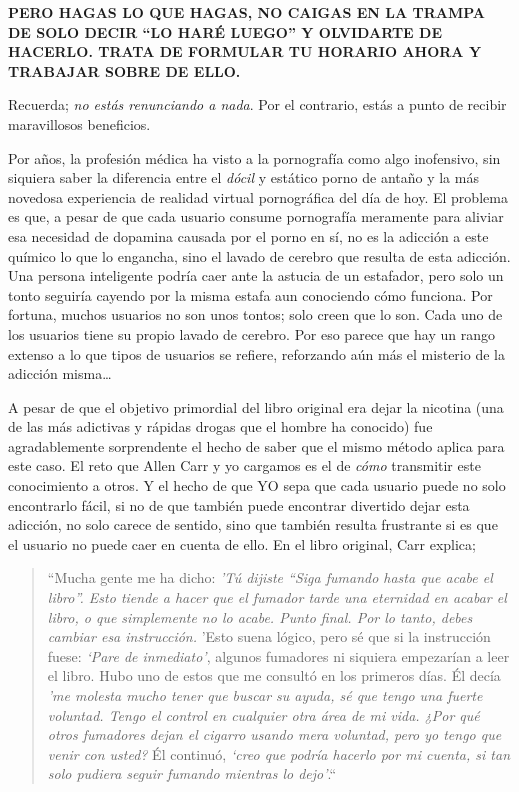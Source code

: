 \documentclass[
]{book}
\begin{document}
\textbf{PERO HAGAS LO QUE HAGAS, NO CAIGAS EN LA TRAMPA DE SOLO DECIR ``LO HARÉ LUEGO'' Y OLVIDARTE DE HACERLO. TRATA DE FORMULAR TU HORARIO {AHORA} Y TRABAJAR SOBRE DE ELLO.}

Recuerda; \emph{no estás renunciando a nada}. Por el contrario, estás a punto de recibir maravillosos beneficios.

Por años, la profesión médica ha visto a la pornografía como algo inofensivo, sin siquiera saber la diferencia entre el \emph{dócil} y estático porno de antaño y la más novedosa experiencia de realidad virtual pornográfica del día de hoy. El problema es que, a pesar de que cada usuario consume pornografía meramente para aliviar esa necesidad de dopamina causada por el porno en sí, no es la adicción a este químico lo que lo engancha, sino el lavado de cerebro que resulta de esta adicción. Una persona inteligente podría caer ante la astucia de un estafador, pero solo un tonto seguiría cayendo por la misma estafa aun conociendo cómo funciona. Por fortuna, muchos usuarios no son unos tontos; solo creen que lo son. Cada uno de los usuarios tiene su propio lavado de cerebro. Por eso parece que hay un rango extenso a lo que tipos de usuarios se refiere, reforzando aún más el misterio de la adicción misma\ldots{}

A pesar de que el objetivo primordial del libro original era dejar la nicotina (una de las más adictivas y rápidas drogas que el hombre ha conocido) fue agradablemente sorprendente el hecho de saber que el mismo método aplica para este caso. El reto que Allen Carr y yo cargamos es el de \emph{cómo} transmitir este conocimiento a otros. Y el hecho de que YO sepa que cada usuario puede no solo encontrarlo fácil, si no de que también puede encontrar divertido dejar esta adicción, no solo carece de sentido, sino que también resulta frustrante si es que el usuario no puede caer en cuenta de ello. En el libro original, Carr explica;

\begin{quote}
``Mucha gente me ha dicho: \emph{'Tú dijiste ``Siga fumando hasta que acabe el libro''. Esto tiende a hacer que el fumador tarde una eternidad en acabar el libro, o que simplemente no lo acabe. Punto final. Por lo tanto, debes cambiar esa instrucción.} 'Esto suena lógico, pero sé que si la instrucción fuese: \emph{`Pare de inmediato'}, algunos fumadores ni siquiera empezarían a leer el libro. Hubo uno de estos que me consultó en los primeros días. Él decía \emph{'me molesta mucho tener que buscar su ayuda, sé que tengo una fuerte voluntad. Tengo el control en cualquier otra área de mi vida. ¿Por qué otros fumadores dejan el cigarro usando mera voluntad, pero yo tengo que venir con usted?} Él continuó, \emph{`creo que podría hacerlo por mi cuenta, si tan solo pudiera seguir fumando mientras lo dejo'}.``
\end{quote}
\end{document}
